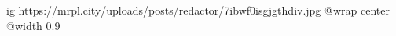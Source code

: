  
 
 
 
 

\ifcmt
  ig https://mrpl.city/uploads/posts/redactor/7ibwf0isgjgthdiv.jpg
  @wrap center
  @width 0.9
\fi
